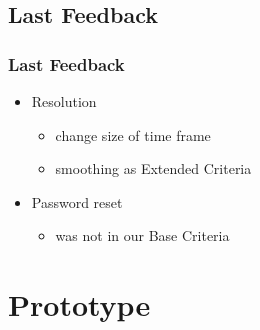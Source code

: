 \documentclass[aspectratio=1610,20pt,utf8]{beamer}
\begin{document}
\subsection{Last Feedback}
\begin{frame}
	\frametitle{Last Feedback}
	\begin{itemize}
		\item Resolution
		\begin{itemize}
			\item change size of time frame
			\item smoothing as Extended Criteria
		\end{itemize}
		\item Password reset
		\begin{itemize}
			\item was not in our Base Criteria
		\end{itemize}
	\end{itemize}
\end{frame}

\section{Prototype}
\end{document}
